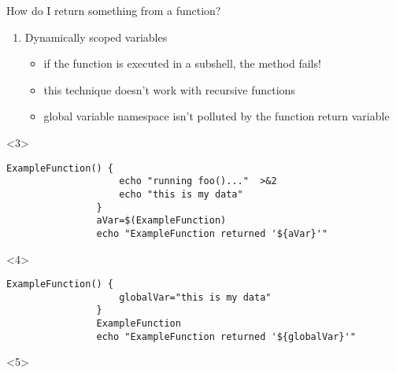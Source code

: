 \begin{frame}[fragile]{How do I return something from a function?}
\begin{overlayarea}{\textwidth}{0.7\textheight}
\begin{enumerate}
                           \begin{itemize}[<only@{5,7}>]
                               \item[\crossmark] you need to manage a temporary file, which is always inconvenient
                               \item[\crossmark] there must be a writable directory somewhere and sufficient space to hold the data therein
                               \item[\checkmark] it will work regardless of whether your function is executed in a subshell
                           \end{itemize}
            \item<only@6-> Dynamically scoped variables
                           \begin{itemize}
                               \item[\crossmark] if the function is executed in a subshell, the method fails!
                               \item[\crossmark] this technique doesn't work with recursive functions
                               \item[\checkmark] global variable namespace isn't polluted by the function return variable
                           \end{itemize}
        \end{enumerate}
        \begin{onlyenv}<3>
            \begin{lstlisting}[style=MyBash, numbers=none]
                ExampleFunction() {
                    echo "running foo()..."  >&2
                    echo "this is my data"
                }
                aVar=$(ExampleFunction)
                echo "ExampleFunction returned '${aVar}'"
            \end{lstlisting}
        \end{onlyenv}
        \begin{onlyenv}<4>
            \begin{lstlisting}[style=MyBash, numbers=none]
                ExampleFunction() {
                    globalVar="this is my data"
                }
                ExampleFunction
                echo "ExampleFunction returned '${globalVar}'"
            \end{lstlisting}
        \end{onlyenv}
        \begin{onlyenv}<5>
            \begin{lstlisting}[style=MyBash, numbers=none]

\end{lstlisting}
\end{onlyenv}
\end{overlayarea}
\end{frame}
